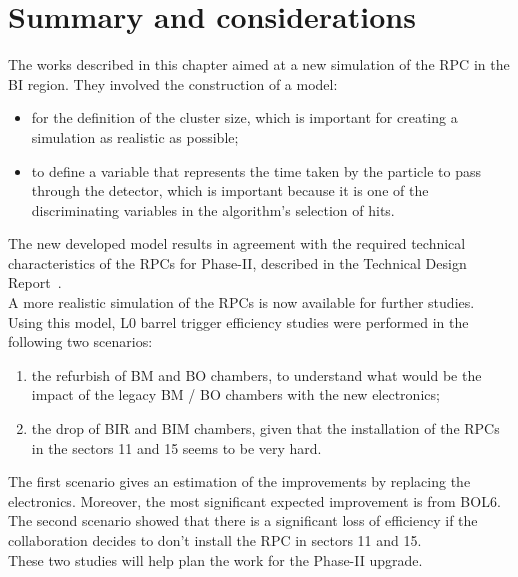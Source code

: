 \section{Summary and considerations }
\label{sec:concl_QT}
The works described in this chapter aimed at a new simulation of the RPC in the BI region.
They involved the construction of a model:
\begin{itemize}
\item for the definition of the cluster size, which is important for creating a simulation as realistic as possible;
\item to define a variable that represents the time taken by the particle to pass through the detector, which is important because it is one of the discriminating variables in the algorithm's selection of hits.
\end{itemize}
The new developed model results in agreement with the required technical characteristics of the RPCs for Phase-II, described in the Technical Design Report~\cite {TDR}.\\
A more realistic simulation of the RPCs is now available for further studies.
\vspace{\baselineskip}
\\Using this model, L0 barrel trigger efficiency studies were performed in the following two scenarios:
\begin{enumerate}
\item the refurbish of BM and BO chambers, to understand what would be the impact of the legacy BM / BO chambers with the new electronics;
\item the drop of BIR and BIM chambers, given that the installation of the RPCs in the sectors 11 and 15 seems to be very hard.
\end{enumerate}
The first scenario gives an estimation of the improvements by replacing the electronics. Moreover, the most significant expected improvement is from BOL6.\\
The second scenario showed that there is a significant loss of efficiency if the collaboration decides to don't install the RPC in sectors 11 and 15.\\
These two studies will help plan the work for the Phase-II upgrade. 